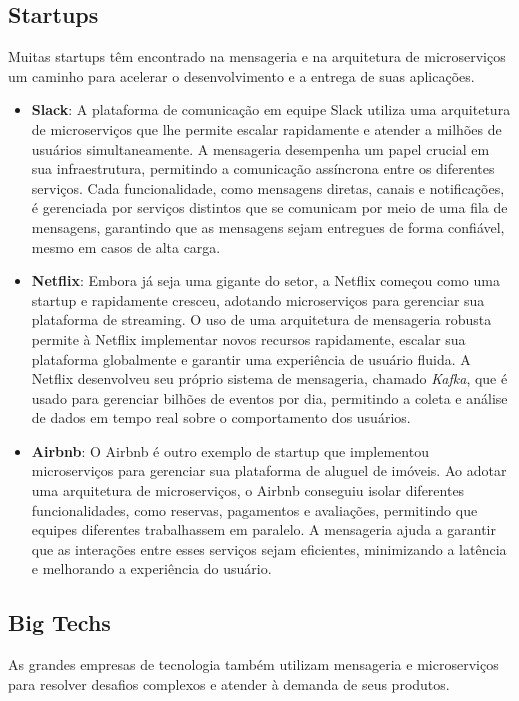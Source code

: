 \subsection{Startups}
Muitas startups têm encontrado na mensageria e na arquitetura de microserviços um caminho para acelerar o desenvolvimento e a entrega de suas aplicações.

\begin{itemize}
    \item \textbf{Slack}: A plataforma de comunicação em equipe Slack utiliza uma arquitetura de microserviços que lhe permite escalar rapidamente e atender a milhões de usuários simultaneamente. A mensageria desempenha um papel crucial em sua infraestrutura, permitindo a comunicação assíncrona entre os diferentes serviços. Cada funcionalidade, como mensagens diretas, canais e notificações, é gerenciada por serviços distintos que se comunicam por meio de uma fila de mensagens, garantindo que as mensagens sejam entregues de forma confiável, mesmo em casos de alta carga.

    \item \textbf{Netflix}: Embora já seja uma gigante do setor, a Netflix começou como uma startup e rapidamente cresceu, adotando microserviços para gerenciar sua plataforma de streaming. O uso de uma arquitetura de mensageria robusta permite à Netflix implementar novos recursos rapidamente, escalar sua plataforma globalmente e garantir uma experiência de usuário fluida. A Netflix desenvolveu seu próprio sistema de mensageria, chamado \textit{Kafka}, que é usado para gerenciar bilhões de eventos por dia, permitindo a coleta e análise de dados em tempo real sobre o comportamento dos usuários.

    \item \textbf{Airbnb}: O Airbnb é outro exemplo de startup que implementou microserviços para gerenciar sua plataforma de aluguel de imóveis. Ao adotar uma arquitetura de microserviços, o Airbnb conseguiu isolar diferentes funcionalidades, como reservas, pagamentos e avaliações, permitindo que equipes diferentes trabalhassem em paralelo. A mensageria ajuda a garantir que as interações entre esses serviços sejam eficientes, minimizando a latência e melhorando a experiência do usuário.
\end{itemize}

\subsection{Big Techs}
As grandes empresas de tecnologia também utilizam mensageria e microserviços para resolver desafios complexos e atender à demanda de seus produtos.

